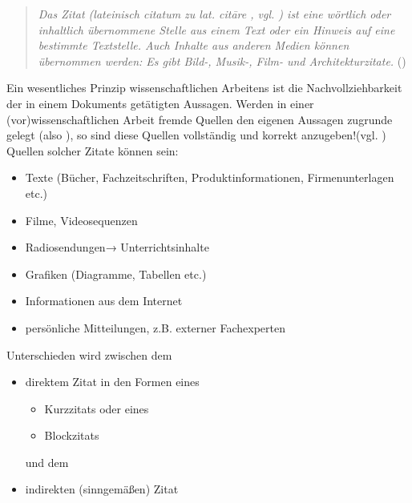 \renewcommand*{\authorOfNextLines}{Helmut Quinz}
\begin{quotation}
	\textit{Das Zitat (lateinisch citatum  zu lat. citāre , vgl. ) 
	ist eine wörtlich oder inhaltlich übernommene Stelle aus einem Text oder ein Hinweis auf eine bestimmte Textstelle. 
	Auch Inhalte aus anderen Medien können übernommen werden: Es gibt Bild-, Musik-, Film- und Architekturzitate.}
	(\cite{dewiki:236507884})
\end{quotation}
Ein wesentliches Prinzip wissenschaftlichen Arbeitens ist die Nachvollziehbarkeit der in einem Dokuments getätigten Aussagen. 
Werden in einer (vor)wissenschaftlichen Arbeit fremde Quellen den eigenen Aussagen zugrunde gelegt (also ), so sind diese Quellen vollständig und korrekt anzugeben!(vgl. \cite{Bergler2020})\\
Quellen solcher Zitate können sein:
\begin{itemize}
	\item Texte (Bücher, Fachzeitschriften, Produktinformationen, Firmenunterlagen etc.)
	\item Filme, Videosequenzen
	\item Radiosendungen→ Unterrichtsinhalte
	\item Grafiken (Diagramme, Tabellen etc.)
	\item Informationen aus dem Internet
	\item persönliche Mitteilungen, z.B. externer Fachexperten
\end{itemize}
\par

Unterschieden wird zwischen dem
\begin{itemize}
	\item direktem Zitat in den Formen eines
	\begin{itemize}
		\item Kurzzitats oder eines 
		\item Blockzitats
	\end{itemize}
		und dem 
	\item indirekten (sinngemäßen) Zitat
\end{itemize}
\FloatBarrier